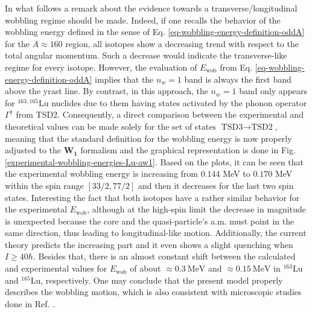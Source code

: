 In what follows a remark about the evidence towards a transverse/longitudinal wobbling regime should be made. Indeed, if one recalls the behavior of the wobbling energy defined in the sense of Eq. \ref{eq-wobbling-energy-definition-oddA} for the $A\approx160$ region, all isotopes show a decreasing trend with respect to the total angular momentum. Such a decrease would indicate the transverse-like regime for every isotope. However, the evaluation of $E_\text{wob}$ from Eq. \ref{eq-wobbling-energy-definition-oddA} implies that the $n_w=1$ band is always the first band above the yrast line. By contrast, in this approach, the $n_w=1$ band only appears for $^{163,165}$Lu nuclides due to them having states activated by the phonon operator $\Gamma^\dagger$ from TSD2. Consequently, a direct comparison between the experimental and theoretical values can be made solely for the set of states $\text{TSD3}\to\text{TSD2}$, meaning that the standard definition for the wobbling energy is now properly adjusted to the $\mathbf{W_1}$ formalism and the graphical representation is done in Fig. \ref{experimental-wobbling-energies-Lu-aw1}. Based on the plots, it can be seen that the experimental wobbling energy is increasing from $0.144$ MeV to $0.170$ MeV within the spin range $[33/2,77/2]$ and then it decreases for the last two spin states. Interesting the fact that both isotopes have a rather similar behavior for the experimental $E_\text{wob}$, although at the high-spin limit the decrease in magnitude is unexpected because the core and the quasi-particle's a.m. must point in the same direction, thus leading to longitudinal-like motion. Additionally, the current theory predicts the increasing part and it even shows a slight quenching when $I\geq 40\hbar$. Besides that, there is an almost constant shift between the calculated and experimental values for $E_\text{wob}$ of about $\approx 0.3\ \text{MeV}$ and $\approx 0.15\ \text{MeV}$ in $^{163}$Lu and $^{165}$Lu, respectively. One may conclude that the present model properly describes the wobbling motion, which is also consistent with microscopic studies done in Ref. \cite{matsuzaki2002wobbling}.
